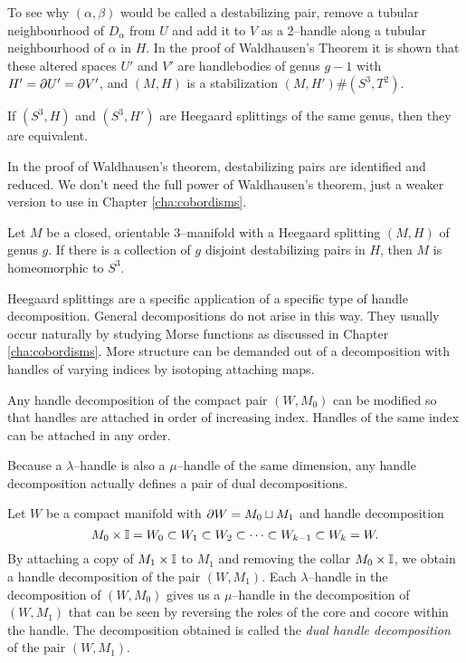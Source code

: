 To see why $(\alpha,\beta)$ would be called a destabilizing pair, remove a tubular neighbourhood of $D_\alpha$ from $U$ and add it to $V$ as a 2--handle along a tubular neighbourhood of $\alpha$ in $H$.
In the proof of Waldhausen's Theorem it is shown that these altered spaces $U'$ and $V'$ are handlebodies of genus $g-1$ with $H'= \partial U' = \partial V'$, and $(M,H)$ is a stabilization $(M,H')\#(S^3,T^2)$.

\begin{theorem}
	If $(S^3,H)$ and $(S^3,H')$ are Heegaard splittings of the same genus, then they are equivalent.
\end{theorem}

In the proof of Waldhausen's theorem, destabilizing pairs are identified and reduced.
We don't need the full power of Waldhausen's theorem, just a weaker version to use in Chapter \ref{cha:cobordisms}.

\begin{theorem}
	\label{thm:lilwald}
	Let $M$ be a closed, orientable 3--manifold with a Heegaard splitting $(M,H)$ of genus $g$.
	If there is a collection of $g$ disjoint destabilizing pairs in $H$, then $M$ is homeomorphic to $S^3$.
\end{theorem}

Heegaard splittings are a specific application of a specific type of handle decomposition.
General decompositions do not arise in this way.
They usually occur naturally by studying Morse functions as discussed in Chapter \ref{cha:cobordisms}.
More structure can be demanded out of a decomposition with handles of varying indices by isotoping attaching maps.

\begin{prop}
	\label{prop:incrindex}
	Any handle decomposition of the compact pair $(W,M_0)$ can be modified so that handles are attached in order of increasing index.
	Handles of the same index can be attached in any order.	
\end{prop}

Because a $\lambda$--handle is also a $\mu$--handle of the same dimension, any handle decomposition actually defines a pair of dual decompositions.

\begin{defn}
	Let $W$ be a compact manifold with $\partial W = M_0 \sqcup M_1$ and handle decomposition
	\[
	M_0\times\mathbb{I} = W_0 \subset W_1 \subset W_2 \subset \cdots \subset W_{k-1} \subset W_k = W.
	\]
	By attaching a copy of $M_1 \times\mathbb{I}$ to $M_1$ and removing the collar $M_0\times\mathbb{I}$, we obtain a handle decomposition of the pair $(W,M_1)$.
	Each $\lambda$--handle in the decomposition of $(W,M_0)$ gives us a $\mu$--handle in the decomposition of $(W,M_1)$ that can be seen by reversing the roles of the core and cocore within the handle.
	The decomposition obtained is called the \emph{dual handle decomposition} of the pair $(W,M_1)$.
\end{defn}

